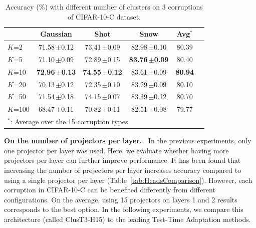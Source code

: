 \documentclass{article}
\newcommand{\mypar}[1]{\vspace{3pt}\noindent\textbf{#1~}}
\newcommand{\ppm}{\,\scriptsize$\pm$}
\newcommand{\dorowcolors}{\rowcolors{2}{gray!15}{white}}
\begin{document}
\begin{table}[!t]
    \centering
    \begin{footnotesize}
    \dorowcolors
    \begin{tabular}{l|ccccc}
    \toprule
        ~ & Gaussian & Shot & Snow & Avg$^*$ \\ \midrule
        $K$=2 & 71.58\ppm{0.12} &  73.41\ppm{0.09} & 82.98\ppm{0.10} & 80.39 \\ 
        $K$=5 & 71.10\ppm{0.09} & 72.89\ppm{0.15} & \textbf{83.76\ppm{0.09}} & 80.40 \\ 
        $K$=10 & \textbf{72.96\ppm{0.13}} & \textbf{74.55\ppm{0.12}} & 83.61\ppm{0.09} & \textbf{80.94} \\ 
        $K$=20 & 70.13\ppm{0.12} & 72.35\ppm{0.10} & 83.29\ppm{0.09} & 80.10 \\ 
        $K$=50 & 71.54\ppm{0.18} & 74.15\ppm{0.07} & 83.39\ppm{0.12} & 80.70 \\ 
        $K$=100 &  68.47\ppm{0.11} & 70.82\ppm{0.11} & 82.51\ppm{0.08} & 79.77 \\ 
        \bottomrule
        \multicolumn{5}{l}{\footnotesize$^*$: Average over the 15 corruption types}\\[2pt]
    \end{tabular}
    \end{footnotesize}
    \caption{Accuracy (\%) with different number of clusters on 3 corruptions of CIFAR-10-C dataset.}
	\label{tab:ClustersComparison}
\end{table}

\mypar{On the number of projectors per layer.} In the previous experiments, only one projector per layer was used.
Here, we evaluate whether having more projectors per layer can further improve performance.
It has been found that increasing the number of projectors per layer increases accuracy compared to using a single projector per layer (Table~\ref{tab:HeadsComparison}). However, each corruption in CIFAR-10-C can be benefited differently from different configurations. On the average, using 15 projectors on layers 1 and 2 results corresponds to the best option. In the following experiments, we compare this architecture (called ClusT3-H15) to the leading Test-Time Adaptation methods.
\end{document}

